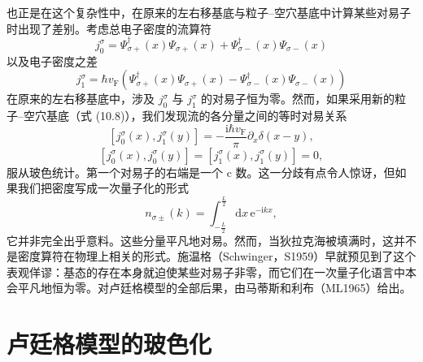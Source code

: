 也正是在这个复杂性中，在原来的左右移基底与粒子–空穴基底中计算某些对易子时出现了差别。考虑总电子密度的流算符
\begin{equation*}
j_{0}^{\sigma}=\Psi_{\sigma+}^{\dagger}(x)\Psi_{\sigma+}(x)+\Psi_{\sigma-}^{\dagger}(x)\Psi_{\sigma-}(x)
\tag{10.14}
\end{equation*}
以及电子密度之差
\begin{equation*}
j_{1}^{\sigma}=\hbar v_{\mathrm{F}}\left(\Psi_{\sigma+}^{\dagger}(x)\Psi_{\sigma+}(x)-\Psi_{\sigma-}^{\dagger}(x)\Psi_{\sigma-}(x)\right)
\tag{10.15}
\end{equation*}
在原来的左右移基底中，涉及 $j_{0}^{\sigma}$ 与 $j_{1}^{\sigma}$ 的对易子恒为零。然而，如果采用新的粒子–空穴基底（式 (10.8)），我们发现流的各分量之间的等时对易关系
\begin{equation*}
\left[j_{0}^{\sigma}(x),j_{1}^{\sigma}(y)\right]=-\frac{\mathrm{i}\hbar v_{\mathrm{F}}}{\pi}\partial_{x}\delta(x-y),
\tag{10.16}
\end{equation*}
\begin{equation*}
\left[j_{0}^{\sigma}(x),j_{0}^{\sigma}(y)\right]=\left[j_{1}^{\sigma}(x),j_{1}^{\sigma}(y)\right]=0,
\tag{10.17}
\end{equation*}
服从玻色统计。第一个对易子的右端是一个 c 数。这一分歧有点令人惊讶，但如果我们把密度写成一次量子化的形式
\begin{equation*}
n_{\sigma\pm}(k)=\int_{-\frac{L}{2}}^{\frac{L}{2}}\mathrm{d}x\,\mathrm{e}^{-\mathrm{i}kx},
\tag{10.18}
\end{equation*}
它并非完全出乎意料。这些分量平凡地对易。然而，当狄拉克海被填满时，这并不是密度算符在物理上相关的形式。施温格（Schwinger，S1959）早就预见到了这个表观佯谬：基态的存在本身就迫使某些对易子非零，而它们在一次量子化语言中本会平凡地恒为零。对卢廷格模型的全部后果，由马蒂斯和利布（ML1965）给出。

\section{卢廷格模型的玻色化}

